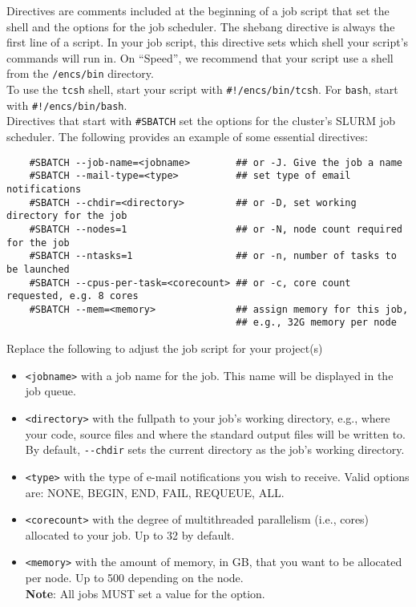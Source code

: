
Directives are comments included at the beginning of a job script that set the shell 
and the options for the job scheduler.
%
The shebang directive is always the first line of a script. In your job script, 
this directive sets which shell your script's commands will run in. On ``Speed'', 
we recommend that your script use a shell from the \texttt{/encs/bin} directory.\\

To use the \texttt{tcsh} shell, start your script with \verb|#!/encs/bin/tcsh|.
For \texttt{bash}, start with \verb|#!/encs/bin/bash|.\\

Directives that start with \verb|#SBATCH| set the options for the cluster's 
SLURM job scheduler. The following provides an example of some essential directives:

\small
\begin{verbatim}
    #SBATCH --job-name=<jobname>        ## or -J. Give the job a name 
    #SBATCH --mail-type=<type>          ## set type of email notifications
    #SBATCH --chdir=<directory>         ## or -D, set working directory for the job
    #SBATCH --nodes=1                   ## or -N, node count required for the job
    #SBATCH --ntasks=1                  ## or -n, number of tasks to be launched
    #SBATCH --cpus-per-task=<corecount> ## or -c, core count requested, e.g. 8 cores
    #SBATCH --mem=<memory>              ## assign memory for this job,
                                        ## e.g., 32G memory per node 
\end{verbatim}
\normalsize

\noindent Replace the following to adjust the job script for your project(s)
\begin{itemize}
    \item \verb+<jobname>+ with a job name for the job. This name will be displayed in the job queue.
    \item \verb+<directory>+ with the fullpath to your job's working directory, e.g., where your code, 
    source files and where the standard output files will be written to. 
    By default, \verb+--chdir+ sets the current directory as the job's working directory.
    \item \verb+<type>+ with the type of e-mail notifications you wish to receive. 
    Valid options are: NONE, BEGIN, END, FAIL, REQUEUE, ALL.
    \item \verb+<corecount>+ with the degree of multithreaded parallelism (i.e., cores) allocated to your job. Up to 32 by default.
    \item \verb+<memory>+ with the amount of memory, in GB, that you want to be allocated per node. Up to 500 depending on the node.\\
    \textbf{Note}: All jobs MUST set a value for the  option.
\end{itemize}

